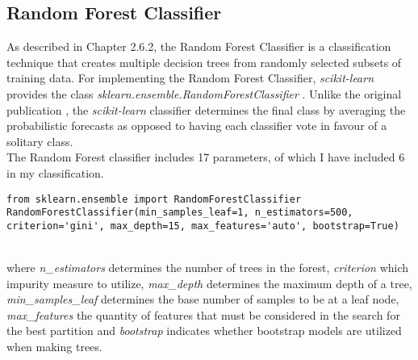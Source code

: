 \documentclass[a4paper, 11pt,titlepage,oneside,openany]{book}
\begin{document}
\subsection{Random Forest Classifier}
As described in Chapter 2.6.2, the Random Forest Classifier is a classification technique that creates multiple decision trees from randomly selected subsets of training data. For implementing the Random Forest Classifier, \textit{scikit-learn} provides the class \textit{sklearn.ensemble.RandomForestClassifier} \cite{coderandomforest}. Unlike the original publication \cite{randomforest}, the \textit{scikit-learn} classifier determines the final class by averaging the probabilistic forecasts as opposed to having each classifier vote in favour of a solitary class. \\
\noindent The Random Forest classifier includes 17 parameters, of which I have included 6 in my classification.\\
\noindent
\begin{minipage}{\linewidth}
	\begin{lstlisting}
from sklearn.ensemble import RandomForestClassifier
RandomForestClassifier(min_samples_leaf=1, n_estimators=500, criterion='gini', max_depth=15, max_features='auto', bootstrap=True)
	\end{lstlisting}
\end{minipage} \\
where \textit{n\_estimators} determines the number of trees in the forest, \textit{criterion} which impurity measure to utilize, \textit{max\_depth} determines the maximum depth of a tree, \textit{min\_samples\_leaf} determines the base number of samples to be at a leaf node, \textit{max\_features} the quantity of features that must be considered in the search for the best partition and \textit{bootstrap} indicates whether bootstrap models are utilized when making trees.
\end{document}
